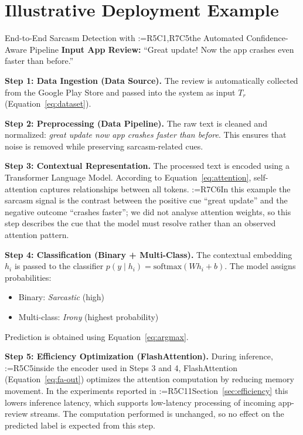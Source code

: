 \documentclass[a4paper,fleqn]{cas-sc}
\makeatletter
\newif\iftracked
\newcommand{\rv@setcolour}[1]{%
  \IfStrEq{#1}{R7C7}{\color{rvEdit}}{%
    \IfSubStr{#1}{R5}{\IfSubStr{#1}{R7}{\color{rvBoth}}{\color{rvFive}}}{\color{rvSeven}}}}
\newcommand{\rv@tag}[1]{\textsuperscript{\sffamily\bfseries\scriptsize[\StrSubstitute{#1}{,}{, }]}\,}
\newcommand{\rv@recordone}[1]{%
  \edef\rv@i{#1}%
  \ifcsdef{rv@n@\rv@i}{}{\csgdef{rv@n@\rv@i}{0}}%
  \csxdef{rv@n@\rv@i}{\the\numexpr\csuse{rv@n@\rv@i}+1\relax}%
  \begingroup\edef\@currentlabel{\rv@i}\label{rv:\rv@i:\csuse{rv@n@\rv@i}}\endgroup}
\newcommand{\rv@record}[1]{\@for\rv@id:=#1\do{\expandafter\rv@recordone\expandafter{\rv@id}}}
\DeclareRobustCommand{\rc}[2]{\rv@record{#1}\iftracked{\rv@setcolour{#1}\rv@tag{#1}#2}\else#2\fi}
\DeclareRobustCommand{\rcrep}[3]{\rv@record{#1}\iftracked{\rv@setcolour{#1}\rv@tag{#1}\rv@strike{#2} #3}\else#3\fi}
\makeatother
\begin{document}
\section{Illustrative Deployment Example}
\label{sec:example}

\begin{examplebox}{End-to-End Sarcasm Detection with \rcrep{R5C1,R7C5}{Agentic Pipeline}{the Automated Confidence-Aware Pipeline}}
\textbf{Input App Review:} ``Great update! Now the app crashes even faster than before.''

\medskip\textbf{Step 1: Data Ingestion (Data Source).} The review is automatically collected from the Google Play Store and passed into the system as input $T_r$ (Equation~\eqref{eq:dataset}).

\medskip\textbf{Step 2: Preprocessing (Data Pipeline).} The raw text is cleaned and normalized: \textit{great update now app crashes faster than before}. This ensures that noise is removed while preserving sarcasm-related cues.

\medskip\textbf{Step 3: Contextual Representation.} The processed text is encoded using a Transformer Language Model. According to Equation~\eqref{eq:attention}, self-attention captures relationships between all tokens. \rcrep{R7C6}{Strong attention is observed between ``great update'' (positive cue) and ``crashes faster'' (negative outcome), and this contradiction forms the core sarcasm signal.}{In this example the sarcasm signal is the contrast between the positive cue ``great update'' and the negative outcome ``crashes faster''; we did not analyse attention weights, so this step describes the cue that the model must resolve rather than an observed attention pattern.}

\medskip\textbf{Step 4: Classification (Binary + Multi-Class).} The contextual embedding $h_i$ is passed to the classifier $p(y\mid h_i) = \mathrm{softmax}(Wh_i+b)$. The model assigns probabilities:
\begin{itemize}
\item Binary: \textit{Sarcastic} (high)
\item Multi-class: \textit{Irony} (highest probability)
\end{itemize}
Prediction is obtained using Equation~\eqref{eq:argmax}.

\medskip\textbf{Step 5: Efficiency Optimization (FlashAttention).} During inference, \rc{R5C5}{inside the encoder used in Steps 3 and 4,} FlashAttention (Equation~\eqref{eq:fa-out}) optimizes the attention computation by reducing memory movement. In the experiments reported in \rcrep{R5C11}{Section 6.1}{Section~\ref{sec:efficiency}} this lowers inference latency, which supports low-latency processing of incoming app-review streams. The computation performed is unchanged, so no effect on the predicted label is expected from this step.


\end{examplebox}
\end{document}

